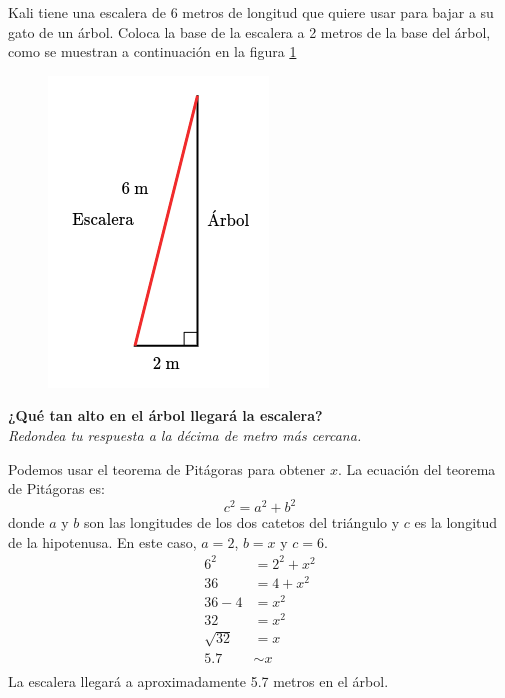 Kali tiene una escalera de 6 metros de longitud que quiere usar para bajar a su gato de un árbol.
Coloca la base de la escalera a 2 metros de la base del árbol,
como se muestran a continuación en la figura \ref{fig:proverb_pitagoras_06}
\begin{figure}[H]
    \begin{center}
        \includegraphics[width=0.2\linewidth]{../images/proverb_pitagoras_06.png}
    \end{center}
    \caption{}
    \label{fig:proverb_pitagoras_06}
\end{figure}

\textbf{¿Qué tan alto en el árbol llegará la escalera?}\\
\textit{Redondea tu respuesta a la décima de metro más cercana.}

\begin{solutionbox}{10cm}
    Podemos usar el teorema de Pitágoras para obtener $x$.
    La ecuación del teorema de Pitágoras es:
    \[c^2=a^2+b^2\]
    donde $a$ y $b$ son las longitudes de los dos catetos del triángulo y $c$ es la longitud de la hipotenusa.
    En este caso, $a=2$, $b=x$ y $c=6$.
    \begin{align*}
        6^2       & =2^2+x^2  \\
        36        & = 4 + x^2 \\
        36-4      & =x^2      \\
        32        & =x^2      \\
        \sqrt{32} & =x        \\
        5.7       & \sim x    \\
    \end{align*}
    La escalera llegará a aproximadamente 5.7 metros en el árbol.
\end{solutionbox}